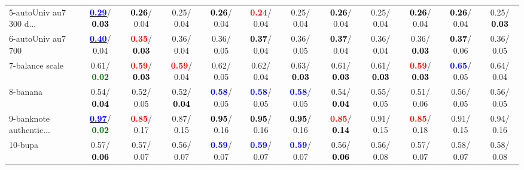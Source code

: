 \begin{table}[h]
\begin{center}
{\begin{tabular}{lc|c|c|c|c|c|c|c|c|c|c}
5-autoUniv au7 300 d... & \underline{\textcolor{blue}{\textbf{  0.29}}}/\textcolor{black}{\textbf{  0.03}} & \textcolor{black}{\textbf{  0.26}}/  0.04 &   0.25/  0.04 & \textcolor{black}{\textbf{  0.26}}/  0.04 & \textcolor{red}{\textbf{  0.24}}/  0.04 &   0.25/  0.04 & \textcolor{black}{\textbf{  0.26}}/  0.04 &   0.25/  0.04 & \textcolor{black}{\textbf{  0.26}}/  0.04 & \textcolor{black}{\textbf{  0.26}}/  0.04 &   0.25/\textcolor{black}{\textbf{  0.03}} \\
6-autoUniv au7 700 & \underline{\textcolor{blue}{\textbf{  0.40}}}/  0.04 & \textcolor{red}{\textbf{  0.35}}/\textcolor{black}{\textbf{  0.03}} &   0.36/  0.04 &   0.36/  0.05 & \textcolor{black}{\textbf{  0.37}}/  0.04 &   0.36/  0.05 & \textcolor{black}{\textbf{  0.37}}/  0.04 &   0.36/  0.04 &   0.36/\textcolor{black}{\textbf{  0.03}} & \textcolor{black}{\textbf{  0.37}}/  0.06 &   0.36/  0.05 \\
7-balance scale &   0.61/\textcolor{darkgreen}{\textbf{  0.02}} & \textcolor{red}{\textbf{  0.59}}/\textcolor{black}{\textbf{  0.03}} & \textcolor{red}{\textbf{  0.59}}/  0.04 &   0.62/  0.05 &   0.62/  0.04 &   0.63/\textcolor{black}{\textbf{  0.03}} &   0.61/\textcolor{black}{\textbf{  0.03}} &   0.61/\textcolor{black}{\textbf{  0.03}} & \textcolor{red}{\textbf{  0.59}}/\textcolor{black}{\textbf{  0.03}} & \textcolor{blue}{\textbf{  0.65}}/  0.05 &   0.64/  0.04 \\ \hline
8-banana &   0.54/\textcolor{black}{\textbf{  0.04}} &   0.52/  0.05 &   0.52/\textcolor{black}{\textbf{  0.04}} & \textcolor{blue}{\textbf{  0.58}}/  0.05 & \textcolor{blue}{\textbf{  0.58}}/  0.05 & \textcolor{blue}{\textbf{  0.58}}/  0.05 &   0.54/\textcolor{black}{\textbf{  0.04}} &   0.55/  0.05 &   0.51/  0.06 &   0.56/  0.05 &   0.56/  0.05 \\
9-banknote authentic... & \underline{\textcolor{blue}{\textbf{  0.97}}}/\textcolor{darkgreen}{\textbf{  0.02}} & \textcolor{red}{\textbf{  0.85}}/  0.17 &   0.87/  0.15 & \textcolor{black}{\textbf{  0.95}}/  0.16 & \textcolor{black}{\textbf{  0.95}}/  0.16 & \textcolor{black}{\textbf{  0.95}}/  0.16 & \textcolor{red}{\textbf{  0.85}}/\textcolor{black}{\textbf{  0.14}} &   0.91/  0.15 & \textcolor{red}{\textbf{  0.85}}/  0.18 &   0.91/  0.15 &   0.94/  0.16 \\
10-bupa &   0.57/\textcolor{black}{\textbf{  0.06}} &   0.57/  0.07 &   0.56/  0.07 & \textcolor{blue}{\textbf{  0.59}}/  0.07 & \textcolor{blue}{\textbf{  0.59}}/  0.07 & \textcolor{blue}{\textbf{  0.59}}/  0.07 &   0.56/\textcolor{black}{\textbf{  0.06}} &   0.56/  0.08 &   0.57/  0.07 &   0.58/  0.07 &   0.58/  0.08 \\

\end{tabular}}
\end{center}
\end{table}
